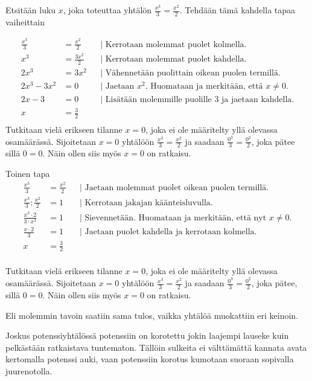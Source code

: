 \begin{esimerkki}
Etsitään luku $x$, joka toteuttaa yhtälön $\frac{x^3}{3}=\frac{x^2}{2}$. Tehdään tämä kahdella tapaa vaiheittain

		\begin{align*}
			\frac{x^3}{3}&=\frac{x^2}{2} && \text{| Kerrotaan molemmat puolet kolmella.} \\
			x^3 &=\frac{3x^2}{2}   && \text{| Kerrotaan molemmat puolet kahdella.} \\
			2x^3 &=3x^2 && \text{| Vähennetään puolittain oikean puolen termillä.} \\
			2x^3 -3x^2&=0 && \text{| Jaetaan $x^2$. Huomataan ja merkitään, että $x\neq0$.} \\
			2x -3&=0 && \text{| Lisätään molemmille puolille $3$ ja jaetaan kahdella.} \\ 
			x&=\frac{3}{2} && \\
		\end{align*}
Tutkitaan vielä erikseen tilanne $x=0$, joka ei ole määritelty yllä olevassa osamäärässä. Sijoitetaan $x=0$ yhtälöön $\frac{x^3}{3}=\frac{x^2}{2}$ ja saadaan $\frac{0^3}{3}=\frac{0^2}{2}$, joka pätee sillä $0=0$. Näin ollen siis myös $x=0$ on ratkaisu. 

Toinen tapa
\begin{align*}
\frac{x^3}{3}&=\frac{x^2}{2} && \text{| Jaetaan molemmat puolet oikean puolen termillä. } \\
\frac{x^3}{3}:\frac{x^2}{2}&=1 && \text{| Kerrotaan jakajan käänteisluvulla.} \\
\frac{x^3\cdot2}{3\cdot x^2}&=1 && \text{| Sievennetään. Huomataan ja merkitään, että nyt $x\neq0$.} \\
\frac{x\cdot2}{3}&=1 && \text{| Jaetaan puolet kahdella ja kerrotaan kolmella.} \\
x&=\frac{3}{2} && \\
\end{align*}

Tutkitaan vielä erikseen tilanne $x=0$, joka ei ole määritelty yllä olevassa osamäärässä. Sijoitetaan $x=0$ yhtälöön $\frac{x^3}{3}=\frac{x^2}{2}$ ja saadaan $\frac{0^3}{3}=\frac{0^2}{2}$, joka pätee, sillä $0=0$. Näin ollen siis myös $x=0$ on ratkaisu.

Eli molemmin tavoin saatiin sama tulos, vaikka yhtälöä muokattiin eri keinoin.

\end{esimerkki}

Joskus potenssiyhtälössä potenssiin on korotettu jokin laajempi lauseke kuin pelkästään ratkaistava tuntematon. Tällöin sulkeita ei välttämättä kannata avata kertomalla potenssi auki, vaan potenssiin korotus kumotaan suoraan sopivalla juurenotolla.


